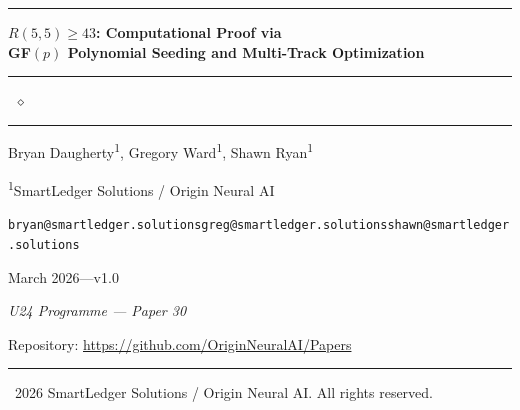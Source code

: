 \documentclass[12pt,a4paper]{article}
\theoremstyle{definition}
\theoremstyle{remark}
\begin{document}

\begin{center}

{\color{u24gold}\rule{\textwidth}{0.5pt}}
\vspace{0.8em}

{\LARGE\bfseries\color{u24navy}
$R(5,5) \ge 43$: Computational Proof via\\[4pt]
GF$(p)$ Polynomial Seeding and Multi-Track Optimization}

\vspace{0.8em}
{\color{u24gold}\rule{0.4\textwidth}{0.5pt}~$\diamond$~\rule{0.4\textwidth}{0.5pt}}
\vspace{0.8em}

{\large Bryan Daugherty\textsuperscript{1},\quad
Gregory Ward\textsuperscript{1},\quad
Shawn Ryan\textsuperscript{1}}

\vspace{0.4em}

{\normalsize\textsuperscript{1}SmartLedger Solutions / Origin Neural AI}

\vspace{0.4em}

{\small\texttt{bryan@smartledger.solutions}\quad\texttt{greg@smartledger.solutions}\quad\texttt{shawn@smartledger.solutions}}

\vspace{0.6em}

{\normalsize March 2026\quad---\quad v1.0}

\vspace{0.4em}

\textit{U24 Programme --- Paper 30}

\vspace{0.4em}

{\small\textcolor{u24navy}{Repository:} \url{https://github.com/OriginNeuralAI/Papers}}

\vspace{0.6em}
{\color{u24gold}\rule{\textwidth}{0.5pt}}

\end{center}

\vspace{0.5em}

{\small\textcopyright~2026 SmartLedger Solutions / Origin Neural AI. All rights reserved.}

\vspace{1em}
\end{document}
